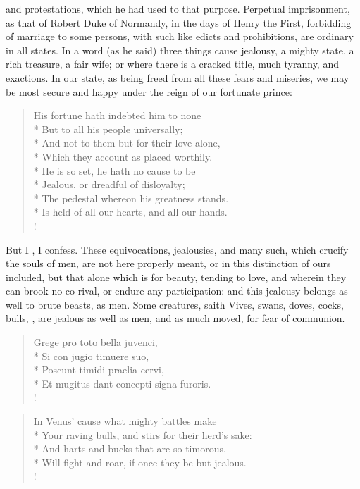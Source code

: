 and protestations, which he had used to that purpose. Perpetual
imprisonment, as that of Robert Duke of Normandy, in the days of
Henry the First, forbidding of marriage to some persons, with such like
edicts and prohibitions, are ordinary in all states. In a word
(as he said) three things cause jealousy, a mighty state, a rich
treasure, a fair wife; or where there is a cracked title, much tyranny,
and exactions. In our state, as being freed from all these fears and
miseries, we may be most secure and happy under the reign of our
fortunate prince:
%
\begin{verse}%
His fortune hath indebted him to none\\*
But to all his people universally;\\*
And not to them but for their love alone,\\*
Which they account as placed worthily.\\*
He is so set, he hath no cause to be\\*
Jealous, or dreadful of disloyalty;\\*
The pedestal whereon his greatness stands.\\*
Is held of all our hearts, and all our hands.\\!
\end{verse}%
%

But I , I confess. These equivocations, jealousies, and many such,
which crucify the souls of men, are not here properly meant, or in this
distinction of ours included, but that alone which is for beauty,
tending to love, and wherein they can brook no co-rival, or endure any
participation: and this jealousy belongs as well to brute beasts, as
men. Some creatures, saith Vives, swans, doves, cocks, bulls,
\etc{}, are jealous as well as men, and as much moved, for fear of
communion.
%
\begin{latin}
\begin{verse}%
Grege pro toto bella juvenci,\\*
Si con jugio timuere suo,\\*
Poscunt timidi praelia cervi,\\*
Et mugitus dant concepti signa furoris.\\!
\end{verse}%
\end{latin}
\translationrule%
\begin{verse}%
In Venus' cause what mighty battles make\\*
Your raving bulls, and stirs for their herd's sake:\\*
And harts and bucks that are so timorous,\\*
Will fight and roar, if once they be but jealous.\\!
\end{verse}%
%

